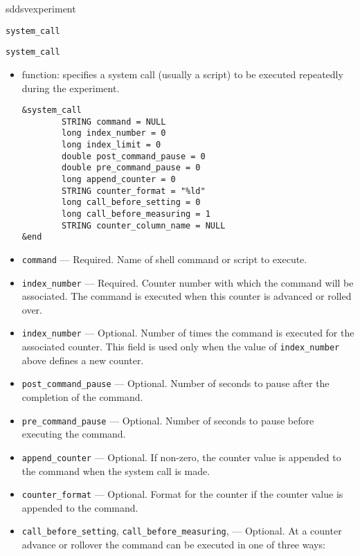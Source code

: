 \begin{sddsprog}{sddsvexperiment}
\begin{itemize}
\begin{latexonly}
\newpage\begin{center}{\Large \verb+system_call+}\end{center}
\end{latexonly}
\begin{htmlonly}
\item {\Large \verb+system_call+}
\end{htmlonly}
\begin{itemize}
   \item function: specifies a system call (usually a script) to be executed repeatedly during the experiment.
\begin{verbatim}
&system_call
        STRING command = NULL
        long index_number = 0
        long index_limit = 0
        double post_command_pause = 0
        double pre_command_pause = 0
        long append_counter = 0
        STRING counter_format = "%ld"
        long call_before_setting = 0
        long call_before_measuring = 1
        STRING counter_column_name = NULL 
&end       
\end{verbatim}
   \item {\verb+command+} --- Required. Name of shell command or script to execute.
   \item {\verb+index_number+} --- Required. Counter number with which the command will be associated. The command is executed
                when this counter is advanced or rolled over.
   \item {\verb+index_number+} --- Optional. Number of times the command is executed for 
                the associated counter. This field is used only when the value of {\verb+index_number+} above defines a new counter.
   \item {\verb+post_command_pause+} --- Optional. Number of seconds to pause after the completion of the command.
   \item {\verb+pre_command_pause+} --- Optional. Number of seconds to pause before executing the command.
   \item {\verb+append_counter+} --- Optional. If non-zero, the counter value is appended to the command when the
                system call is made.
   \item {\verb+counter_format+} --- Optional. Format for the counter if the counter value is appended to the command.
   \item {\verb+call_before_setting+}, {\verb+call_before_measuring+}, --- Optional.
                At a counter advance or rollover
                the command can be executed in one of three ways:

\end{itemize}
\end{itemize}
\end{sddsprog}
